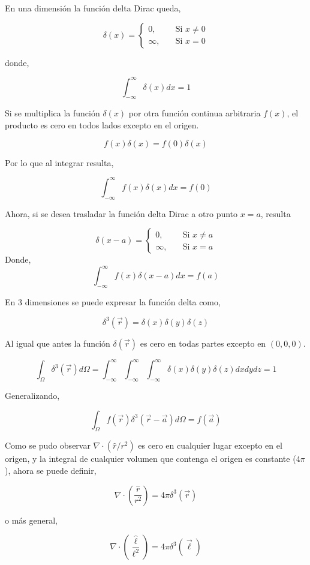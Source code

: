 \documentclass[12pt,letterpaper]{article}
\numberwithin{equation}{section}
\begin{document}
\noindent En una dimensión la función delta Dirac queda,

$$\delta(x)=\begin{cases}
0,&\quad \text{Si }x\neq0\\
\infty,&\quad \text{Si }x=0
\end{cases}$$

\noindent donde,

$$\int_{-\infty}^{\infty}\delta(x)dx=1$$

\noindent Si se multiplica la función $\delta(x)$ por otra función continua arbitraria $f(x)$, el producto es cero en todos lados excepto en el origen.

$$f(x)\delta(x)=f(0)\delta(x)$$ 

\noindent Por lo que al integrar resulta,

$$\int_{-\infty}^{\infty}f(x)\delta(x)dx=f(0)$$

Ahora, si se desea trasladar la función delta Dirac a otro punto $x=a$, resulta

$$\delta(x-a)=\begin{cases}
0,&\quad \text{Si }x\neq a\\
\infty,&\quad \text{Si }x=a
\end{cases}$$
Donde,
$$\int_{-\infty}^{\infty}f(x)\delta(x-a)dx=f(a)$$

\noindent En 3 dimensiones se puede expresar la función delta como,

$$\delta^3(\vec{r})=\delta(x)\delta(y)\delta(z)$$

\noindent Al igual que antes la función $\delta(\vec{r})$ es cero en todas partes excepto en $(0,0,0)$.

$$\int_{\Omega}\delta^3(\vec{r})d\varOmega=\int_{-\infty}^{\infty}\int_{-\infty}^{\infty}\int_{-\infty}^{\infty}\delta(x)\delta(y)\delta(z)dxdydz=1$$

\noindent Generalizando,

$$\int_{\Omega}f(\vec{r})\delta^3(\vec{r}-\vec{a})d\varOmega=f(\vec{a})$$

\noindent Como se pudo observar $\nabla\cdot (\hat{r}/r^2)$ es cero en cualquier lugar excepto en el origen, y la integral de cualquier volumen que contenga el origen es constante ($4\pi$), ahora se puede definir, 

$$\nabla\cdot (\frac{\hat{r}}{r^2})=4\pi\delta^3(\vec{r})$$

\noindent o más general,

$$\nabla\cdot (\frac{\hat{\ell}}{\ell^2})=4\pi\delta^3(\vec{\ell})$$
\end{document}
